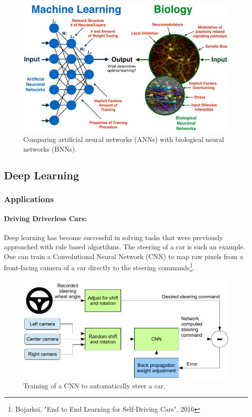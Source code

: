 \documentclass[main]{subfiles}
\begin{document}
\begin{figure}[h]
    \centering
    \includegraphics[width=0.8\linewidth]{01_Introduction/figures/MLvsBIO.png}
    \caption{Comparing artificial neural networks (ANNs) with biological neural networks (BNNs).}
    \label{fig:MLvsBIO}
\end{figure}
%

\subsection{Deep Learning}

\subsubsection{Applications}
\paragraph{Driving Driverless Cars:} 
Deep learning has become successful in solving tasks that were previously approached with rule based algortihms. The steering of a car is such an example. One can train a Convolutional Neural Network (CNN) to map raw pixels from a front-facing camera of a car directly to the steering commands\footnote{Bojarksi, "End to End Learning for Self-Driving Cars", 2016}.
\begin{figure}[h]
    \centering
    \includegraphics[width=0.6\linewidth]{01_Introduction/figures/driverless.png}
    \caption{Training of a CNN to automatically steer a car.}
    \label{fig:my_label}
\end{figure}
\end{document}
